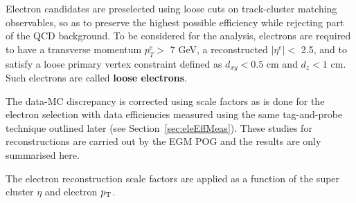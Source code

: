 Electron candidates are preselected using loose cuts on track-cluster matching observables, so as to preserve the highest possible efficiency while rejecting part of the QCD background. To be considered for the analysis, electrons are required to have a
transverse momentum $p^e_T >$ 7 GeV, a reconstructed $|\eta^e| <$ 2.5, and to satisfy a loose primary vertex
constraint defined as $d_{xy} < 0.5$ cm and $d_z < 1$ cm.
Such electrons are called {\bf loose electrons}.

The data-MC discrepancy is corrected using scale factors as is done for the electron selection with data efficiencies measured using the same tag-and-probe technique outlined later (see Section~\ref{sec:eleEffMeas}).
These studies for reconstructions are carried out by the EGM POG and the results are only summarised here.

The electron reconstruction scale factors
are applied as a function of the super cluster $\eta$ and electron $p_{\mathrm{T}}$.
